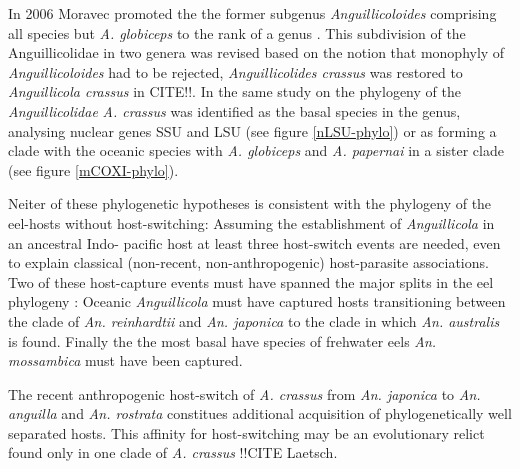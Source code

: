 In 2006 Moravec promoted the the former subgenus
\textit{Anguillicoloides} comprising all species but
\textit{A. globiceps} to the rank of a genus
\cite{moravec_anguillicoloides}. This subdivision of the
Anguillicolidae in two genera was revised based on the notion that
monophyly of \textit{Anguillicoloides} had to be rejected,
\textit{Anguillicolides crassus} was restored to \textit{Anguillicola
  crassus} in CITE!!. In the same study on the phylogeny of the
\textit{Anguillicolidae} \textit{A. crassus} was identified as the
basal species in the genus, analysing nuclear genes SSU and LSU (see
figure \ref{nLSU-phylo}) or as forming a clade with the oceanic
species with \textit{A. globiceps} and \textit{A. papernai} in a
sister clade (see figure \ref{mCOXI-phylo}).



Neiter of these phylogenetic hypotheses is consistent with the
phylogeny of the eel-hosts without host-switching: Assuming the
establishment of \textit{Anguillicola} in an ancestral Indo- pacific
host at least three host-switch events are needed, even to explain
classical (non-recent, non-anthropogenic) host-parasite associations.
Two of these host-capture events must have spanned the major splits in
the eel phylogeny \cite{minegishi_molecular_2005}: Oceanic
\textit{Anguillicola} must have captured hosts transitioning between
the clade of \textit{An. reinhardtii} and \textit{An. japonica} to the
clade in which \textit{An. australis} is found. Finally the the most
basal have species of frehwater eels \textit{An. mossambica} must have
been captured.

The recent anthropogenic host-switch of \textit{A. crassus} from
\textit{An. japonica} to \textit{An. anguilla} and
\textit{An. rostrata} constitues additional acquisition of
phylogenetically well separated hosts. This affinity for
host-switching may be an evolutionary relict found only in one clade
of \textit{A. crassus} !!CITE Laetsch.

